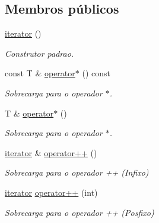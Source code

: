 \subsection*{Membros públicos}
\begin{DoxyCompactItemize}
\item 
\hyperlink{class_list_1_1iterator_a90c7cf3543e4b139a6262d54a1f0fc63}{iterator} ()\hypertarget{class_list_1_1iterator_a90c7cf3543e4b139a6262d54a1f0fc63}{}\label{class_list_1_1iterator_a90c7cf3543e4b139a6262d54a1f0fc63}

\begin{DoxyCompactList}\small\item\em Construtor padrao. \end{DoxyCompactList}\item 
const T \& \hyperlink{class_list_1_1iterator_ad6d5f1650454631411d07996e892b017}{operator$\ast$} () const \hypertarget{class_list_1_1iterator_ad6d5f1650454631411d07996e892b017}{}\label{class_list_1_1iterator_ad6d5f1650454631411d07996e892b017}

\begin{DoxyCompactList}\small\item\em Sobrecarga para o operador $\ast$. \end{DoxyCompactList}\item 
T \& \hyperlink{class_list_1_1iterator_a24294112d6f9d39fa0353b6d81100d9c}{operator$\ast$} ()\hypertarget{class_list_1_1iterator_a24294112d6f9d39fa0353b6d81100d9c}{}\label{class_list_1_1iterator_a24294112d6f9d39fa0353b6d81100d9c}

\begin{DoxyCompactList}\small\item\em Sobrecarga para o operador $\ast$. \end{DoxyCompactList}\item 
\hyperlink{class_list_1_1iterator}{iterator} \& \hyperlink{class_list_1_1iterator_abc8967388edaaed0fa5414d79831d9c2}{operator++} ()\hypertarget{class_list_1_1iterator_abc8967388edaaed0fa5414d79831d9c2}{}\label{class_list_1_1iterator_abc8967388edaaed0fa5414d79831d9c2}

\begin{DoxyCompactList}\small\item\em Sobrecarga para o operador ++ (Infixo) \end{DoxyCompactList}\item 
\hyperlink{class_list_1_1iterator}{iterator} \hyperlink{class_list_1_1iterator_a03d5920ec99ec81284b4a622b4781e14}{operator++} (int)\hypertarget{class_list_1_1iterator_a03d5920ec99ec81284b4a622b4781e14}{}\label{class_list_1_1iterator_a03d5920ec99ec81284b4a622b4781e14}

\begin{DoxyCompactList}\small\item\em Sobrecarga para o operador ++ (Posfixo) \end{DoxyCompactList}\end{DoxyCompactItemize}
